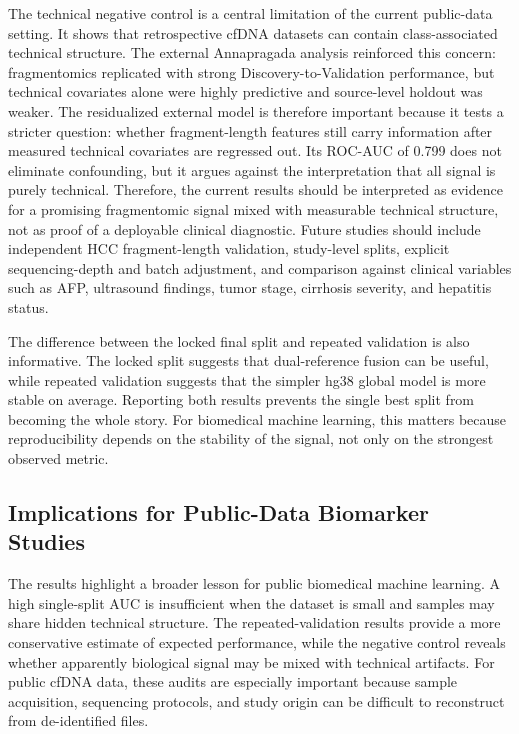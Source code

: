\documentclass[conference]{IEEEtran}
\begin{document}
The technical negative control is a central limitation of the current public-data setting. It shows that retrospective cfDNA datasets can contain class-associated technical structure. The external Annapragada analysis reinforced this concern: fragmentomics replicated with strong Discovery-to-Validation performance, but technical covariates alone were highly predictive and source-level holdout was weaker. The residualized external model is therefore important because it tests a stricter question: whether fragment-length features still carry information after measured technical covariates are regressed out. Its ROC-AUC of 0.799 does not eliminate confounding, but it argues against the interpretation that all signal is purely technical. Therefore, the current results should be interpreted as evidence for a promising fragmentomic signal mixed with measurable technical structure, not as proof of a deployable clinical diagnostic. Future studies should include independent HCC fragment-length validation, study-level splits, explicit sequencing-depth and batch adjustment, and comparison against clinical variables such as AFP, ultrasound findings, tumor stage, cirrhosis severity, and hepatitis status.

The difference between the locked final split and repeated validation is also informative. The locked split suggests that dual-reference fusion can be useful, while repeated validation suggests that the simpler hg38 global model is more stable on average. Reporting both results prevents the single best split from becoming the whole story. For biomedical machine learning, this matters because reproducibility depends on the stability of the signal, not only on the strongest observed metric.

\subsection{Implications for Public-Data Biomarker Studies}
The results highlight a broader lesson for public biomedical machine learning. A high single-split AUC is insufficient when the dataset is small and samples may share hidden technical structure. The repeated-validation results provide a more conservative estimate of expected performance, while the negative control reveals whether apparently biological signal may be mixed with technical artifacts. For public cfDNA data, these audits are especially important because sample acquisition, sequencing protocols, and study origin can be difficult to reconstruct from de-identified files.
\end{document}
